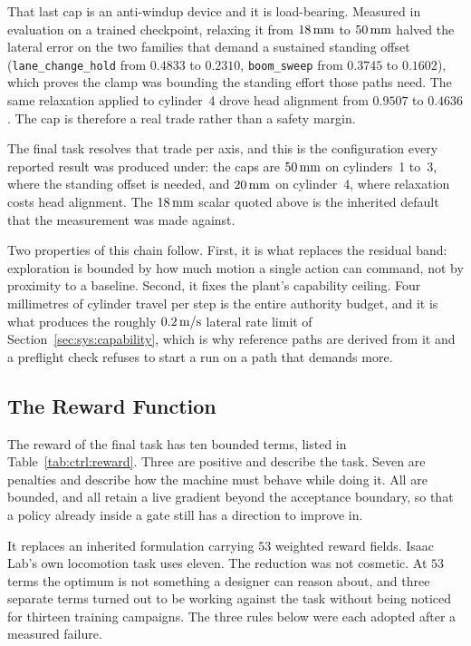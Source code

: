 That last cap is an anti-windup device and it is load-bearing.
Measured in evaluation on a trained checkpoint, relaxing it from $\unit[18]{mm}$
to $\unit[50]{mm}$ halved the lateral error on the two families that demand a sustained standing offset
(\texttt{lane\_change\_hold} from $0.4833$ to
$0.2310$, \texttt{boom\_sweep} from $0.3745$ to $0.1602$), which proves the clamp was bounding the standing effort those paths need. The same
relaxation applied to cylinder~4 drove head alignment from $0.9507$ to
$0.4636$. The cap is therefore a real trade rather than a safety margin.

The final \ppoROM{} task resolves that trade per axis, and this is the
configuration every reported \ppoROM{} result was produced under: the caps are
$\unit[50]{mm}$ on cylinders~1 to~3, where the standing offset is needed, and
$\unit[20]{mm}$ on cylinder~4, where relaxation costs head alignment. The
$\unit[18]{mm}$ scalar quoted above is the inherited default that the
measurement was made against.

Two properties of this chain follow. First, it is what replaces
the residual band: exploration is bounded by how much motion a single action
can command, not by proximity to a baseline. Second, it fixes the plant's
capability ceiling. Four millimetres of cylinder travel per step is the entire
authority budget, and it is what produces the roughly $\unit[0.2]{m/s}$ lateral
rate limit of Section~\ref{sec:sys:capability}, which is why reference paths
are derived from it and a preflight check refuses to start a run on a path that
demands more.

\subsection{The Reward Function}

The reward of the final \ppoROM{} task has ten bounded terms, listed in
Table~\ref{tab:ctrl:reward}. Three are positive and describe the task. Seven
are penalties and describe how the machine must behave while doing it. All are
bounded, and all retain a live gradient beyond the acceptance boundary, so that
a policy already inside a gate still has a direction to improve in.

It replaces an inherited formulation carrying $53$ weighted reward fields.
Isaac Lab's own locomotion task uses eleven. The reduction was not
cosmetic. At $53$ terms the optimum is not something a designer can reason
about, and three separate terms turned out to be working against the task
without being noticed for thirteen training campaigns. The three rules below
were each adopted after a measured failure.

